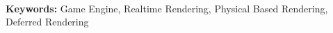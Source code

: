 \paragraph{}
\noindent \textbf{Keywords:}
Game Engine, Realtime Rendering, Physical Based Rendering, Deferred Rendering
